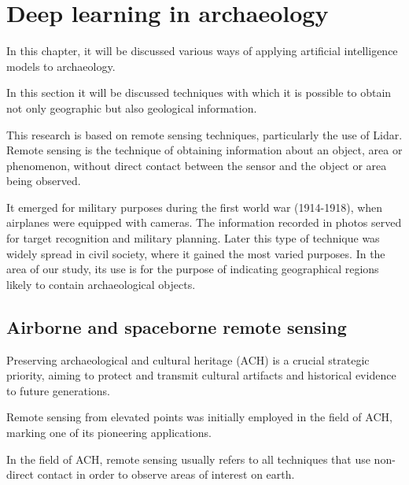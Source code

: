 

\chapter{Deep learning in archaeology}

\begin{introduction}
In this chapter, it will be discussed various ways of applying artificial intelligence models to archaeology.
\end{introduction}
In this section it will be discussed techniques with which it is possible to obtain not only geographic but also geological information. 

This research is based on remote sensing techniques, particularly the use of Lidar. 
Remote sensing is the technique of obtaining information about an object, area or phenomenon, without direct contact between the sensor and the object or area being observed.

It emerged for military purposes during the first world war (1914-1918), when airplanes were equipped with cameras. The information recorded in photos served for target recognition and military planning.
Later this type of technique was widely spread in civil society, where it gained the most varied purposes. In the area of our study, its use is for the purpose of indicating geographical regions likely to contain archaeological objects.



\section{Airborne and spaceborne remote sensing}

Preserving archaeological and cultural heritage (ACH) is a crucial strategic priority, aiming to protect and transmit cultural artifacts and historical evidence to future generations.

Remote sensing from elevated points was initially employed in the field of ACH\cite{asmr}, marking one of its pioneering applications.

In the field of ACH, remote sensing usually refers to all techniques that use non-direct contact in order to observe areas of interest on earth.

